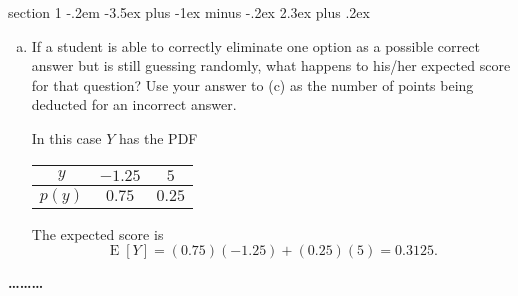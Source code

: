 \documentclass[answers,11pt]{exam}
\makeatletter
\DeclareMathOperator*{\E}{E}
\newenvironment{problem}{\@startsection
       {section}
       {1}
       {-.2em}
       {-3.5ex plus -1ex minus -.2ex}
       {2.3ex plus .2ex}
       {\pagebreak[3]%
       \large\bf\noindent{Problem }
       }
       }
       {%
       \begin{center}\large\bf \ldots\ldots\ldots\end{center}}
\makeatother
\begin{document}
\begin{problem}{}
\begin{enumerate}[(a)]
\begin{solution}
\end{solution}

\item If a student is able to correctly eliminate one option as a possible
correct answer but is still guessing randomly, what happens to his/her
expected score for that question? Use your answer to (c) as the number of
points being deducted for an incorrect answer.
\begin{solution}
In this case $Y$ has the PDF
\begin{center}
\begin{tabular}{c|cc}
$y$    & $-1.25$   & $5$ \\
\hline
$p(y)$ & $0.75$ & $0.25$
\end{tabular}
\end{center}
The expected score is
\[
  \E[Y] = (0.75)(-1.25) + (0.25)(5)
        = 0.3125.
\]


\end{solution}

\end{enumerate}

\end{problem}
\end{document}
